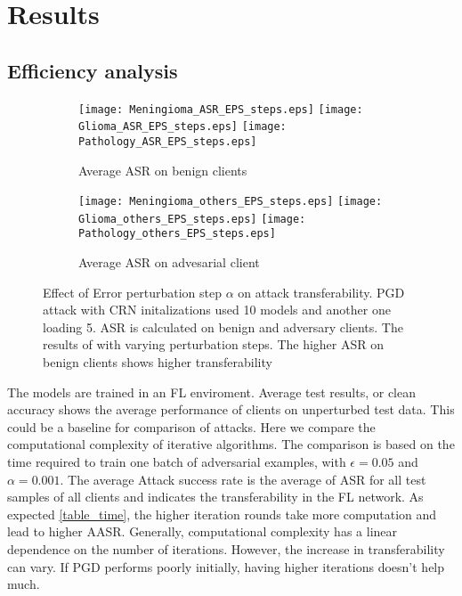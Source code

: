 \section{Results}









\subsection{Efficiency analysis}


\begin{figure*}[h!]
     \centering
     \begin{subfigure}
         \centering
         \texttt{[image: Meningioma\_ASR\_EPS\_steps.eps]}
          \texttt{[image: Glioma\_ASR\_EPS\_steps.eps]}
           \texttt{[image: Pathology\_ASR\_EPS\_steps.eps]}
         \caption{Average ASR on benign clients }
         \label{fig:y equals x}
     \end{subfigure}
     \hfill
     \begin{subfigure}
          \centering
         \texttt{[image: Meningioma\_others\_EPS\_steps.eps]}
          \texttt{[image: Glioma\_others\_EPS\_steps.eps]}
           \texttt{[image: Pathology\_others\_EPS\_steps.eps]}
         \caption{Average ASR on advesarial client }
         \label{fig:y equals x}
     \end{subfigure}
     \hfill
        \caption{Effect of Error perturbation step $\alpha$ on attack transferability. PGD attack with CRN initalizations used 10 models and another one loading 5. ASR is calculated on benign and adversary clients. The results of with varying perturbation steps. The higher ASR on benign clients shows higher transferability}
        \label{fig:three graphs}
\end{figure*}

The models are trained in an FL enviroment. Average test results, or clean accuracy shows the average performance of clients on unperturbed test data. This could be a baseline for comparison of attacks.
Here we compare the computational complexity of iterative algorithms. The comparison is based on the time required to train one batch of adversarial examples, with  $\epsilon=0.05$ and $\alpha=0.001$. The average Attack success rate is the average of ASR for all test samples of all clients and indicates the transferability in the FL network.
As expected \ref{table_time}, the higher iteration rounds take more computation and lead to higher AASR. Generally, computational complexity has a linear dependence on the number of iterations. However, the increase in transferability can vary. If PGD performs poorly initially, having higher iterations doesn't help much. 

